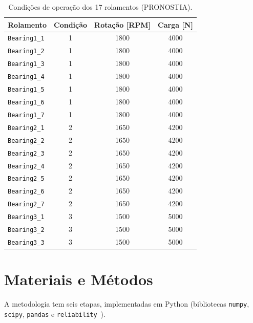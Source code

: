 \documentclass[conference]{IEEEtran}
\begin{document}
\begin{table}[!htbp]
  \centering
  \caption{Condições de operação dos 17 rolamentos (PRONOSTIA).}
  \label{tab:condicoes}
  \begin{tabular}{lccc}
    \toprule
    Rolamento & Condição & Rotação [RPM] & Carga [N] \\
    \midrule
    \texttt{Bearing1\_1} & 1 & 1800 & 4000 \\
    \texttt{Bearing1\_2} & 1 & 1800 & 4000 \\
    \texttt{Bearing1\_3} & 1 & 1800 & 4000 \\
    \texttt{Bearing1\_4} & 1 & 1800 & 4000 \\
    \texttt{Bearing1\_5} & 1 & 1800 & 4000 \\
    \texttt{Bearing1\_6} & 1 & 1800 & 4000 \\
    \texttt{Bearing1\_7} & 1 & 1800 & 4000 \\
    \texttt{Bearing2\_1} & 2 & 1650 & 4200 \\
    \texttt{Bearing2\_2} & 2 & 1650 & 4200 \\
    \texttt{Bearing2\_3} & 2 & 1650 & 4200 \\
    \texttt{Bearing2\_4} & 2 & 1650 & 4200 \\
    \texttt{Bearing2\_5} & 2 & 1650 & 4200 \\
    \texttt{Bearing2\_6} & 2 & 1650 & 4200 \\
    \texttt{Bearing2\_7} & 2 & 1650 & 4200 \\
    \texttt{Bearing3\_1} & 3 & 1500 & 5000 \\
    \texttt{Bearing3\_2} & 3 & 1500 & 5000 \\
    \texttt{Bearing3\_3} & 3 & 1500 & 5000 \\
    \bottomrule
  \end{tabular}
\end{table}

\section{Materiais e Métodos}
\label{sec:metodo}

A metodologia tem seis etapas, implementadas em Python (bibliotecas \texttt{numpy},
\texttt{scipy}, \texttt{pandas} e \texttt{reliability}~\cite{reid2022}).
\end{document}
